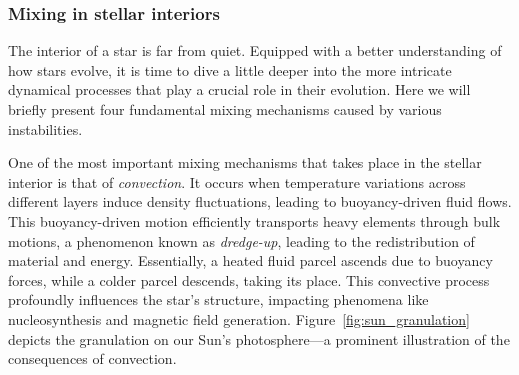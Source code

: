 \documentclass[main.tex]{subfiles}
\begin{document}
    \subsubsection{Mixing in stellar interiors}
    The interior of a star is far from quiet. Equipped with a better understanding of how stars evolve, it is time to dive a little deeper into the more intricate dynamical processes that play a crucial role in their evolution. Here we will briefly present four fundamental mixing mechanisms caused by various instabilities.

    One of the most important mixing mechanisms that takes place in the stellar interior is that of \textit{convection}. It occurs when temperature variations across different layers induce density fluctuations, leading to buoyancy-driven fluid flows. This buoyancy-driven motion efficiently transports heavy elements through bulk motions, a phenomenon known as \textit{dredge-up}, leading to the redistribution of material and energy. Essentially, a heated fluid parcel ascends due to buoyancy forces, while a colder parcel descends, taking its place. This convective process profoundly influences the star's structure, impacting phenomena like nucleosynthesis and magnetic field generation. Figure~\ref{fig:sun_granulation} depicts the granulation on our Sun's photosphere---a prominent illustration of the consequences of convection.
    
\end{document}
